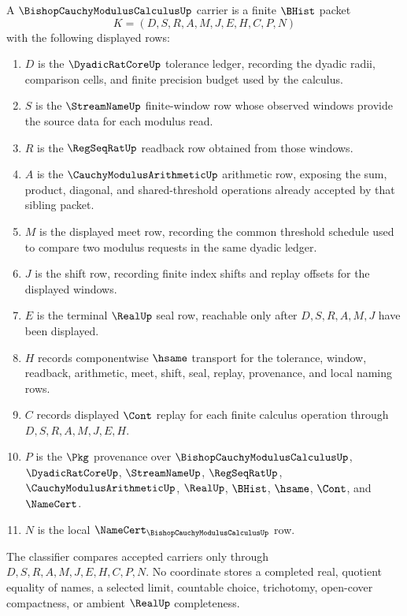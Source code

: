 \begin{definition}
\label{def:bishop-cauchy-modulus-calculus-carrier}
A $\BishopCauchyModulusCalculusUp$ carrier is a finite $\BHist$ packet
$$
K=(D,S,R,A,M,J,E,H,C,P,N)
$$
with the following displayed rows:
\begin{enumerate}
\item $D$ is the $\DyadicRatCoreUp$ tolerance ledger, recording the dyadic radii, comparison cells, and finite precision budget used by the calculus.
\item $S$ is the $\StreamNameUp$ finite-window row whose observed windows provide the source data for each modulus read.
\item $R$ is the $\RegSeqRatUp$ readback row obtained from those windows.
\item $A$ is the $\CauchyModulusArithmeticUp$ arithmetic row, exposing the sum, product, diagonal, and shared-threshold operations already accepted by that sibling packet.
\item $M$ is the displayed meet row, recording the common threshold schedule used to compare two modulus requests in the same dyadic ledger.
\item $J$ is the shift row, recording finite index shifts and replay offsets for the displayed windows.
\item $E$ is the terminal $\RealUp$ seal row, reachable only after $D,S,R,A,M,J$ have been displayed.
\item $H$ records componentwise $\hsame$ transport for the tolerance, window, readback, arithmetic, meet, shift, seal, replay, provenance, and local naming rows.
\item $C$ records displayed $\Cont$ replay for each finite calculus operation through $D,S,R,A,M,J,E,H$.
\item $P$ is the $\Pkg$ provenance over $\BishopCauchyModulusCalculusUp$, $\DyadicRatCoreUp$, $\StreamNameUp$, $\RegSeqRatUp$, $\CauchyModulusArithmeticUp$, $\RealUp$, $\BHist$, $\hsame$, $\Cont$, and $\NameCert$.
\item $N$ is the local $\NameCert_{\BishopCauchyModulusCalculusUp}$ row.
\end{enumerate}
The classifier compares accepted carriers only through $D,S,R,A,M,J,E,H,C,P,N$. No coordinate stores a completed real, quotient equality of names, a selected limit, countable choice, trichotomy, open-cover compactness, or ambient $\RealUp$ completeness.
\end{definition}

